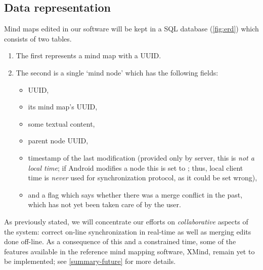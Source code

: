 %
%
%
%
%

\subsection{Data representation}
\label{subsec:data-repr}

Mind maps edited in our software will be kept in a SQL database (\cref{fig:erd}) which consists of two tables.

\begin{enumerate}
	\item The first represents a mind map with a UUID.
	\item The second is a single `mind node' which has the following fields: \begin{itemize}
		\item UUID,
		\item its mind map's UUID,
		\item some textual content,
		\item parent node UUID,
		\item timestamp of the last modification (provided only by server, this is \emph{not a local time}; if Android modifies a node this is set to ; thus, local client time is \emph{never} used for synchronization protocol, as it could be set wrong),
		\item and a flag which says whether there was a merge conflict in the past, which has not yet been taken care of by the user.
	\end{itemize}
\end{enumerate}

As previously stated, we will concentrate our efforts on \emph{collaborative} aspects of the system: correct on-line synchronization in real-time as well as merging edits done off-line. As a consequence of this and a constrained time, some of the features available in the reference mind mapping software, XMind, remain yet to be implemented; see \cref{summary-future} for more details.

